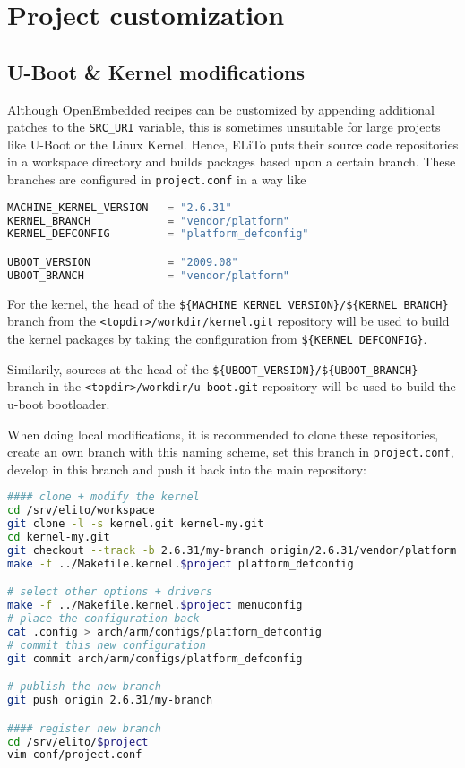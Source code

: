 \chapter{Project customization}
\label{chap:project-customization}

\section{U-Boot \& Kernel modifications}
\label{sec:project-customization_u-boot+kernel-modifications}

Although OpenEmbedded recipes can be customized by appending
additional patches to the \texttt{SRC\_URI} variable, this is
sometimes unsuitable for large projects like U-Boot or the Linux
Kernel.  Hence, ELiTo puts their source code repositories in a
workspace directory and builds packages based upon a certain
branch. These branches are configured in \texttt{project.conf} in a
way like

\begin{lstlisting}[language=python]
MACHINE_KERNEL_VERSION   = "2.6.31"
KERNEL_BRANCH            = "vendor/platform"
KERNEL_DEFCONFIG         = "platform_defconfig"

UBOOT_VERSION            = "2009.08"
UBOOT_BRANCH             = "vendor/platform"
\end{lstlisting}

For the kernel, the head of the
\texttt{\$\{MACHINE\_KERNEL\_VERSION\}/\$\{KERNEL\_BRANCH\}} branch
from the \texttt{<topdir>/workdir/kernel.git} repository will be used
to build the kernel packages by taking the configuration from
\texttt{\$\{KERNEL\_DEFCONFIG\}}.

Similarily, sources at the head of the
\texttt{\$\{UBOOT\_VERSION\}/\$\{UBOOT\_BRANCH\}} branch in the
\texttt{<topdir>/workdir/u-boot.git} repository will be used to
build the u-boot bootloader.

When doing local modifications, it is recommended to clone these
repositories, create an own branch with this naming scheme, set this
branch in \texttt{project.conf}, develop in this branch and push it
back into the main repository:

\begin{lstlisting}[language=sh]
#### clone + modify the kernel
cd /srv/elito/workspace
git clone -l -s kernel.git kernel-my.git
cd kernel-my.git
git checkout --track -b 2.6.31/my-branch origin/2.6.31/vendor/platform
make -f ../Makefile.kernel.$project platform_defconfig

# select other options + drivers
make -f ../Makefile.kernel.$project menuconfig
# place the configuration back
cat .config > arch/arm/configs/platform_defconfig
# commit this new configuration
git commit arch/arm/configs/platform_defconfig

# publish the new branch
git push origin 2.6.31/my-branch

#### register new branch
cd /srv/elito/$project
vim conf/project.conf
\end{lstlisting}


